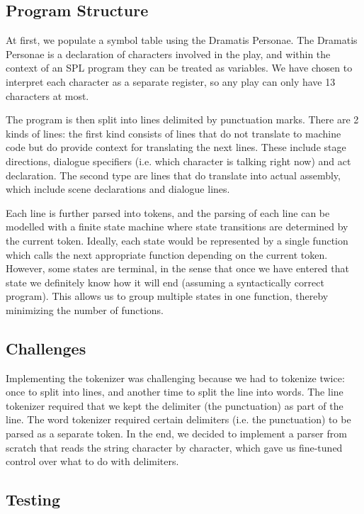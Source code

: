 \documentclass[11pt]{article}
\begin{document}
\subsection{Program Structure}

At first, we populate a symbol table using the Dramatis Personae. The Dramatis Personae is a declaration of characters involved in the play, and within the context of an SPL program they can be treated as variables. We have chosen to interpret each character as a separate register, so any play can only have 13 characters at most.

The program is then split into lines delimited by punctuation marks. There are 2 kinds of lines: the first kind consists of lines that do not translate to machine code but do provide context for translating the next lines. These include stage directions, dialogue specifiers (i.e. which character is talking right now) and act declaration. The second type are lines that do translate into actual assembly, which include scene declarations and dialogue lines.

Each line is further parsed into tokens, and the parsing of each line can be modelled with a finite state machine where state transitions are determined by the current token. Ideally, each state would be represented by a single function which calls the next appropriate function depending on the current token. However, some states are terminal, in the sense that once we have entered that state we definitely know how it will end (assuming a syntactically correct program). This allows us to group multiple states in one function, thereby minimizing the number of functions.

\subsection{Challenges}

Implementing the tokenizer was challenging because we had to tokenize twice: once to split into lines, and another time to split the line into words. The line tokenizer required that we kept the delimiter (the punctuation) as part of the line. The word tokenizer required certain delimiters (i.e. the punctuation) to be parsed as a separate token. In the end, we decided to implement a parser from scratch that reads the string character by character, which gave us fine-tuned control over what to do with delimiters.

\subsection{Testing}
\end{document}
